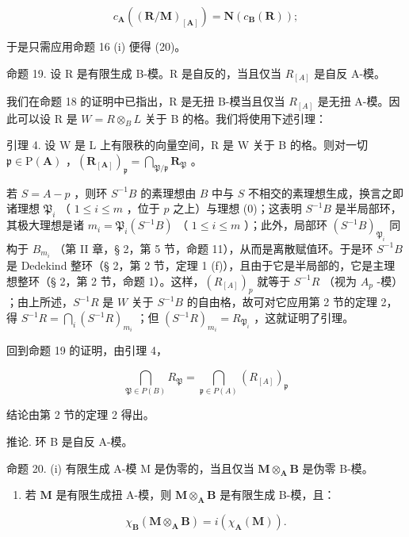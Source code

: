 \[
c _ {\mathbf {A}} ((\mathbf {R} / \mathbf {M}) _ {[ \mathbf {A} ]}) = \mathbf {N} (c _ {\mathbf {B}} (\mathbf {R}));
\]

于是只需应用命题 16 (i) 便得 (20)。

命题 19. 设 R 是有限生成 B-模。R 是自反的，当且仅当 \(R_{[A]}\) 是自反 A-模。

我们在命题 18 的证明中已指出，R 是无扭 B-模当且仅当 \(R_{[A]}\) 是无扭 A-模。因此可以设 R 是 \(W = R \otimes_{B} L\) 关于 B 的格。我们将使用下述引理：

引理 4. 设 W 是 L 上有限秩的向量空间，R 是 W 关于 B 的格。则对一切 \(\mathfrak{p} \in \mathrm{P}(\mathbf{A})\) ，\((\mathbf{R}_{[\mathbf{A}]})_{\mathfrak{p}} = \bigcap_{\mathfrak{P}/\mathfrak{p}} \mathbf{R}_{\mathfrak{P}}\) 。

若 \(S = A - p\) ，则环 \(S^{-1}B\) 的素理想由 \(B\) 中与 \(S\) 不相交的素理想生成，换言之即诸理想 \(\mathfrak{P}_i\) （ \(1 \leqslant i \leqslant m\) ，位于 \(p\) 之上）与理想 (0)；这表明 \(S^{-1}B\) 是半局部环，其极大理想是诸 \(m_i = \mathfrak{P}_i(S^{-1}B)\) （ \(1 \leqslant i \leqslant m\) ）；此外，局部环 \((S^{-1}B)_{\mathfrak{P}_i}\) 同构于 \(B_{m_i}\) （第 II 章，§ 2，第 5 节，命题 11），从而是离散赋值环。于是环 \(S^{-1}B\) 是 Dedekind 整环（§ 2，第 2 节，定理 1 (f)），且由于它是半局部的，它是主理想整环（§ 2，第 2 节，命题 1）。这样，\((R_{[A]})_p\) 就等于 \(S^{-1}R\) （视为 \(A_p\) -模） ；由上所述，\(S^{-1}R\) 是 \(W\) 关于 \(S^{-1}B\) 的自由格，故可对它应用第 2 节的定理 2，得 \(S^{-1}R = \bigcap_i (S^{-1}R)_{m_i}\) ；但 \((S^{-1}R)_{m_i} = R_{\mathfrak{P}_i}\) ，这就证明了引理。

回到命题 19 的证明，由引理 4，

\[
\bigcap_ {\mathfrak {P} \in P (B)} R _ {\mathfrak {P}} = \bigcap_ {\mathfrak {p} \in P (A)} \left(R _ {[ A ]}\right) _ {\mathfrak {p}}
\]

结论由第 2 节的定理 2 得出。

推论. 环 B 是自反 A-模。

命题 20. (i) 有限生成 A-模 M 是伪零的，当且仅当 \(\mathbf{M} \otimes_{\mathbf{A}} \mathbf{B}\) 是伪零 B-模。

\begin{enumerate}
\def\labelenumi{(\roman{enumi})}
\setcounter{enumi}{1}
\tightlist
\item
  若 \(\mathbf{M}\) 是有限生成扭 A-模，则 \(\mathbf{M} \otimes_{\mathbf{A}} \mathbf{B}\) 是有限生成 B-模，且：
\end{enumerate}

\[
\chi_ {\mathbf {B}} (\mathbf {M} \otimes_ {\mathbf {A}} \mathbf {B}) = i (\chi_ {\mathbf {A}} (\mathbf {M})).\tag{22}
\]

